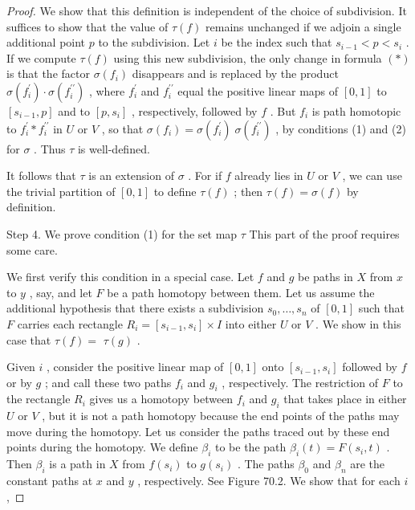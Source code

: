 \begin{proof}
We show that this definition is independent of the choice of subdivision. It suffices to show that the value of \(\tau \left( f\right)\) remains unchanged if we adjoin a single additional point \(p\) to the subdivision. Let \(i\) be the index such that \({s}_{i - 1} < p < {s}_{i}\) . If we compute \(\tau \left( f\right)\) using this new subdivision, the only change in formula \(\left( *\right)\) is that the factor \(\sigma \left( {f}_{i}\right)\) disappears and is replaced by the product \(\sigma \left( {f}_{i}^{\prime }\right)  \cdot  \sigma \left( {f}_{i}^{\prime \prime }\right)\) , where \({f}_{i}^{\prime }\) and \({f}_{i}^{\prime \prime }\) equal the positive linear maps of \(\left\lbrack  {0,1}\right\rbrack\) to \(\left\lbrack  {{s}_{i - 1},p}\right\rbrack\) and to \(\left\lbrack  {p,{s}_{i}}\right\rbrack\) , respectively, followed by \(f\) . But \({f}_{i}\) is path homotopic to \({f}_{i}^{\prime } * {f}_{i}^{\prime \prime }\) in \(U\) or \(V\) , so that \(\sigma \left( {f}_{i}\right)  = \sigma \left( {f}_{i}^{\prime }\right) \;\sigma \left( {f}_{i}^{\prime \prime }\right)\) , by conditions (1) and (2) for \(\sigma\) . Thus \(\tau\) is well-defined.

It follows that \(\tau\) is an extension of \(\sigma\) . For if \(f\) already lies in \(U\) or \(V\) , we can use the trivial partition of \(\left\lbrack  {0,1}\right\rbrack\) to define \(\tau \left( f\right)\) ; then \(\tau \left( f\right)  = \sigma \left( f\right)\) by definition.

Step 4. We prove condition (1) for the set map \(\tau\) This part of the proof requires some care.

We first verify this condition in a special case. Let \(f\) and \(g\) be paths in \(X\) from \(x\) to \(y\) , say, and let \(F\) be a path homotopy between them. Let us assume the additional hypothesis that there exists a subdivision \({s}_{0},\ldots ,{s}_{n}\) of \(\left\lbrack  {0,1}\right\rbrack\) such that \(F\) carries each rectangle \({R}_{i} = \left\lbrack  {{s}_{i - 1},{s}_{i}}\right\rbrack \times  I\) into either \(U\) or \(V\) . We show in this case that \(\tau \left( f\right)  =\)  \(\tau \left( g\right)\) .

Given \(i\) , consider the positive linear map of \(\left\lbrack  {0,1}\right\rbrack\) onto \(\left\lbrack  {{s}_{i - 1},{s}_{i}}\right\rbrack\) followed by \(f\) or by \(g\) ; and call these two paths \({f}_{i}\) and \({g}_{i}\) , respectively. The restriction of \(F\) to the rectangle \({R}_{i}\) gives us a homotopy between \({f}_{i}\) and \({g}_{i}\) that takes place in either \(U\) or \(V\) , but it is not a path homotopy because the end points of the paths may move during the homotopy. Let us consider the paths traced out by these end points during the homotopy. We define \({\beta }_{i}\) to be the path \({\beta }_{i}\left( t\right)  = F\left( {{s}_{i},t}\right)\) . Then \({\beta }_{i}\) is a path in \(X\) from \(f\left( {s}_{i}\right)\) to \(g\left( {s}_{i}\right)\) . The paths \({\beta }_{0}\) and \({\beta }_{n}\) are the constant paths at \(x\) and \(y\) , respectively. See Figure 70.2. We show that for each \(i\) ,


\end{proof}
